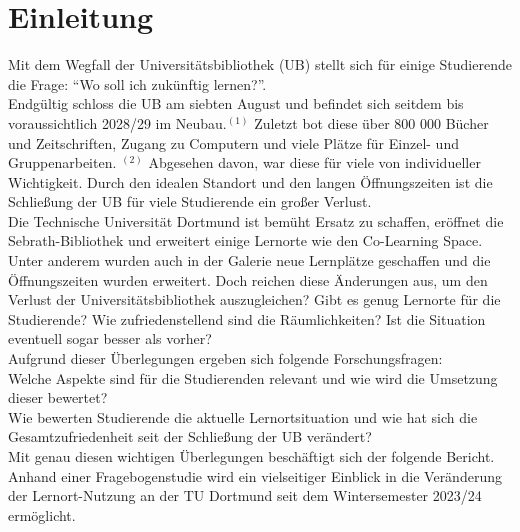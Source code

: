 \documentclass[11pt, a4paper]{article}
\begin{document}
\section{Einleitung}
\label{Einleitung}
Mit dem Wegfall der Universitätsbibliothek (UB) stellt sich für einige Studierende die Frage: “Wo soll ich zukünftig lernen?”.\\
Endgültig schloss die UB am siebten August und befindet sich seitdem bis voraussichtlich 2028/29 im Neubau.\hyperref[seitenverweis]{$^{(1)}$} Zuletzt bot diese über 800 000 Bücher und Zeitschriften, Zugang zu Computern und viele Plätze für Einzel- und Gruppenarbeiten. \hyperref[seitenverweis]{$^{(2)}$} Abgesehen davon, war diese für viele von individueller Wichtigkeit.
Durch den idealen Standort und den langen Öffnungszeiten ist die Schließung der UB für viele Studierende ein großer Verlust.\\
Die Technische Universität Dortmund ist bemüht Ersatz zu schaffen, eröffnet die Sebrath-Bibliothek und erweitert einige Lernorte wie den Co-Learning Space.
Unter anderem wurden auch in der Galerie neue Lernplätze geschaffen und die Öffnungszeiten wurden erweitert.
Doch reichen diese Änderungen aus, um den Verlust der Universitätsbibliothek auszugleichen?
Gibt es genug Lernorte für die Studierende? Wie zufriedenstellend sind die Räumlichkeiten? Ist die Situation eventuell sogar besser als vorher?\\

\vspace{-0.2cm}
Aufgrund dieser Überlegungen ergeben sich folgende Forschungsfragen:\\
Welche Aspekte sind für die Studierenden relevant und wie wird die Umsetzung dieser bewertet?\\
Wie bewerten Studierende die aktuelle Lernortsituation und wie hat sich die Gesamtzufriedenheit seit der Schließung der UB verändert?\\
Mit genau diesen wichtigen Überlegungen beschäftigt sich der folgende Bericht.
Anhand einer Fragebogenstudie wird ein vielseitiger Einblick in die Veränderung der Lernort-Nutzung an der TU Dortmund seit dem Wintersemester 2023/24 ermöglicht.
\end{document}
